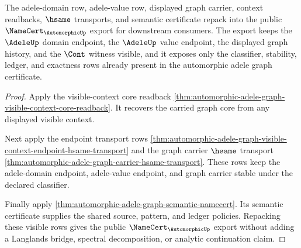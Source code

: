 \begin{theorem}
\label{thm:automorphic-public-certificate-export}
The adele-domain row, adele-value row, displayed graph carrier, context
readbacks, $\hsame$ transports, and semantic certificate repack into the public
$\NameCert_{\AutomorphicUp}$ export for downstream consumers. The export keeps
the $\AdeleUp$ domain endpoint, the $\AdeleUp$ value endpoint, the displayed
graph history, and the $\Cont$ witness visible, and it exposes only the
classifier, stability, ledger, and exactness rows already present in the
automorphic adele graph certificate.
\end{theorem}
\begin{proof}
Apply the visible-context core readback
\autoref{thm:automorphic-adele-graph-visible-context-core-readback}. It
recovers the carried graph core from any displayed visible context.

Next apply the endpoint transport rows
\autoref{thm:automorphic-adele-graph-visible-context-endpoint-hsame-transport}
and the graph carrier $\hsame$ transport
\autoref{thm:automorphic-adele-graph-carrier-hsame-transport}. These rows keep
the adele-domain endpoint, adele-value endpoint, and graph carrier stable under
the declared classifier.

Finally apply
\autoref{thm:automorphic-adele-graph-semantic-namecert}. Its semantic
certificate supplies the shared source, pattern, and ledger policies. Repacking
these visible rows gives the public $\NameCert_{\AutomorphicUp}$ export without
adding a Langlands bridge, spectral decomposition, or analytic continuation
claim.
\end{proof}

